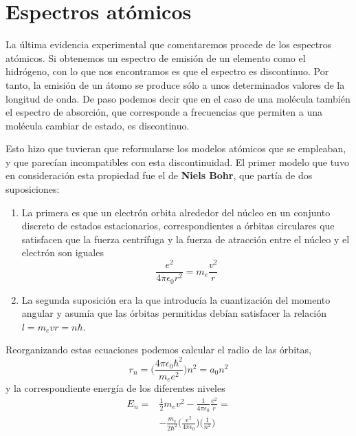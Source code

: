 \documentclass{tufte-handout}
\begin{document}
\section{Espectros atómicos}
La última evidencia experimental que comentaremos procede de los 
espectros atómicos. Si  obtenemos un espectro de emisión
de un elemento como el hidrógeno, con lo que nos encontramos
es que el espectro es discontinuo. Por tanto, la emisión de un
átomo se produce sólo a unos determinados valores de la longitud
de onda. De paso podemos decir que en el caso de una molécula 
también el espectro de absorción, que corresponde a frecuencias
que permiten a una molécula cambiar de estado, es discontinuo.

Esto hizo que tuvieran que reformularse los modelos atómicos que 
se empleaban, y que parecían incompatibles con esta discontinuidad.
El primer modelo que tuvo en consideración esta propiedad fue
el de \textbf{Niels Bohr}, que partía de dos suposiciones: 
\begin{enumerate}
    \item La primera es que un electrón orbita alrededor del
    núcleo en un conjunto discreto de estados estacionarios, 
    correspondientes a órbitas circulares que satisfacen que la
    fuerza centrífuga y la fuerza de atracción entre el núcleo y el
    electrón son iguales
    \begin{equation}
        \frac{e^2}{4\pi \epsilon_0 r^2}=m_e\frac{v^2}{r}
    \end{equation}
    \item La segunda suposición era la que introducía la cuantización del momento
    angular
    y asumía que las órbitas permitidas debían satisfacer la relación
    $l=m_evr=n\hbar$.
\end{enumerate}
Reorganizando estas ecuaciones podemos calcular el radio de las órbitas,
\begin{equation}
    r_n=\bigg(\frac{4\pi \epsilon_0\hbar^2}{m_ee^2}\bigg)n^2=a_0n^2    
\end{equation}
y la correspondiente energía de los diferentes niveles
\begin{equation}
    \begin{split}
    E_n= & \frac{1}{2}m_ev^2 - \frac{1}{4\pi \epsilon_0}\frac{e^2}{r}=\\
    & -\frac{m_e}{2\hbar^2}\bigg(\frac{e^2}{4\pi\epsilon_0}\bigg)\bigg(\frac{1}{n^2}\bigg)
    \end{split}
\end{equation}
\end{document}
